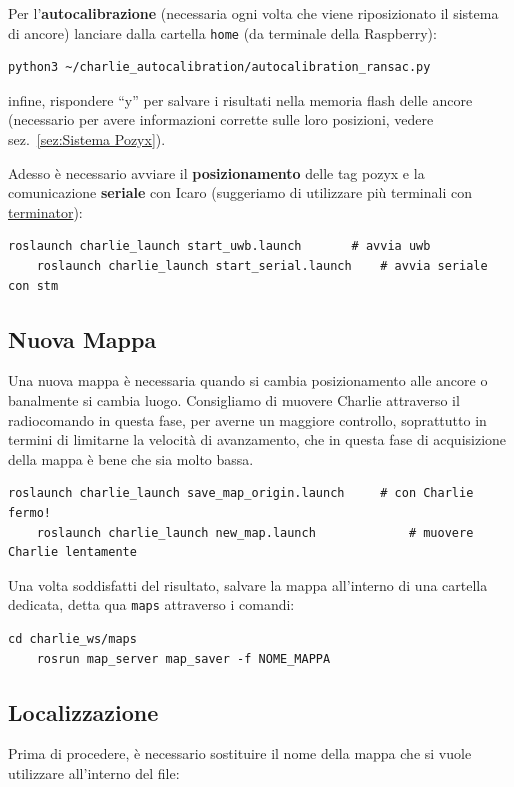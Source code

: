 Per l'\textbf{autocalibrazione} (necessaria ogni volta che viene riposizionato il sistema di ancore) lanciare 
dalla cartella \texttt{home} (da terminale della Raspberry):
\begin{lstlisting}[style=bash]
	python3 ~/charlie_autocalibration/autocalibration_ransac.py
\end{lstlisting}
infine, rispondere ``y'' per salvare i risultati nella memoria flash delle ancore (necessario per avere informazioni corrette sulle loro posizioni, vedere 
sez.~\ref{sez:Sistema Pozyx}).

Adesso è necessario avviare il \textbf{posizionamento} delle tag pozyx e la comunicazione \textbf{seriale} con Icaro (suggeriamo di utilizzare più terminali 
con \href{https://terminator-gtk3.readthedocs.io/en/latest/}{terminator}):
\begin{lstlisting}[style=bash]
	roslaunch charlie_launch start_uwb.launch		# avvia uwb
	roslaunch charlie_launch start_serial.launch	# avvia seriale con stm
\end{lstlisting}

\subsection{Nuova Mappa}
\label{sez: nuova mappa}
Una nuova mappa è necessaria quando si cambia posizionamento alle ancore o banalmente si cambia luogo. Consigliamo di muovere Charlie attraverso il radiocomando 
in questa fase, per averne un maggiore controllo, soprattutto in termini di limitarne la velocità di avanzamento, che in questa fase di acquisizione della mappa 
è bene che sia molto bassa.
\begin{lstlisting}[style=bash]
	roslaunch charlie_launch save_map_origin.launch		# con Charlie fermo!
	roslaunch charlie_launch new_map.launch 			# muovere Charlie lentamente
\end{lstlisting}

Una volta soddisfatti del risultato, salvare la mappa all'interno di una cartella dedicata, detta qua \verb|maps| attraverso i comandi:
\begin{lstlisting}[style=bash]
	cd charlie_ws/maps
	rosrun map_server map_saver -f NOME_MAPPA
\end{lstlisting}

\subsection{Localizzazione}
Prima di procedere, è necessario sostituire il nome della mappa che si vuole utilizzare all'interno del file:

